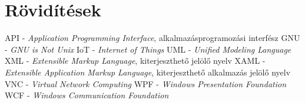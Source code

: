 \chapter*{Rövidítések}

API  - \textit{Application Programming Interface}, alkalmazásprogramozási interfész
GNU  - \textit{GNU is Not Unix}
IoT  - \textit{Internet of Things}
UML  - \textit{Unified Modeling Language}
XML  - \textit{Extensible Markup Language}, kiterjeszthető jelölő nyelv
XAML - \textit{Extensible Application Markup Language}, kiterjeszthető alkalmazás jelölő nyelv
VNC  - \textit{Virtual Network Computing}
WPF  - \textit{Windows Presentation Foundation}
WCF  - \textit{Windows Communication Foundation}